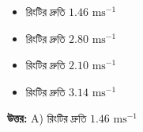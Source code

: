 \documentclass[12pt, a4paper]{article}
\begin{document}
\begin{itemize}[label={}, leftmargin=1cm, itemsep=0.5em]
    \item[\textbf{A)}] রিংটির দ্রুতি $1.46\text{ ms}^{-1}$
    \item[\textbf{B)}] রিংটির দ্রুতি $2.80\text{ ms}^{-1}$
    \item[\textbf{C)}] রিংটির দ্রুতি $2.10\text{ ms}^{-1}$
    \item[\textbf{D)}] রিংটির দ্রুতি $3.14\text{ ms}^{-1}$
\end{itemize}

\vspace{0.5em}
\begin{tcolorbox}[answerbox]
    \textbf{\color{success} উত্তর:} A) রিংটির দ্রুতি $1.46\text{ ms}^{-1}$
\end{tcolorbox}
\vspace{1em}
\end{document}
